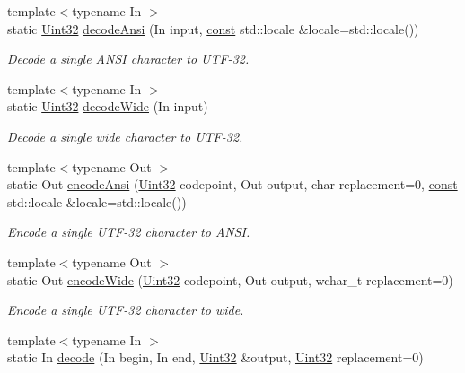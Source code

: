 \begin{DoxyCompactItemize}
{\footnotesize template$<$typename In $>$ }\\static \hyperlink{namespacesf_aa746fb1ddef4410bddf198ebb27e727c}{Uint32} \hyperlink{classsf_1_1_utf_3_0132_01_4_a68346ea833f88267a7c739d4d96fb86f}{decode\-Ansi} (In input, \hyperlink{term__entry_8h_a57bd63ce7f9a353488880e3de6692d5a}{const} std\-::locale \&locale=std\-::locale())
\begin{DoxyCompactList}\small\item\em Decode a single A\-N\-S\-I character to U\-T\-F-\/32. \end{DoxyCompactList}\item 
{\footnotesize template$<$typename In $>$ }\\static \hyperlink{namespacesf_aa746fb1ddef4410bddf198ebb27e727c}{Uint32} \hyperlink{classsf_1_1_utf_3_0132_01_4_a043fe25f5f4dbc205e78e6f1d99840dc}{decode\-Wide} (In input)
\begin{DoxyCompactList}\small\item\em Decode a single wide character to U\-T\-F-\/32. \end{DoxyCompactList}\item 
{\footnotesize template$<$typename Out $>$ }\\static Out \hyperlink{classsf_1_1_utf_3_0132_01_4_af6590226a071076ca22d818573a16ded}{encode\-Ansi} (\hyperlink{namespacesf_aa746fb1ddef4410bddf198ebb27e727c}{Uint32} codepoint, Out output, char replacement=0, \hyperlink{term__entry_8h_a57bd63ce7f9a353488880e3de6692d5a}{const} std\-::locale \&locale=std\-::locale())
\begin{DoxyCompactList}\small\item\em Encode a single U\-T\-F-\/32 character to A\-N\-S\-I. \end{DoxyCompactList}\item 
{\footnotesize template$<$typename Out $>$ }\\static Out \hyperlink{classsf_1_1_utf_3_0132_01_4_a52e511e74ddc5df1bbf18f910193bc47}{encode\-Wide} (\hyperlink{namespacesf_aa746fb1ddef4410bddf198ebb27e727c}{Uint32} codepoint, Out output, wchar\-\_\-t replacement=0)
\begin{DoxyCompactList}\small\item\em Encode a single U\-T\-F-\/32 character to wide. \end{DoxyCompactList}\item 
{\footnotesize template$<$typename In $>$ }\\static In \hyperlink{classsf_1_1_utf_3_0132_01_4_ad754ce8476f7b80563890dec12cefd46}{decode} (In begin, In end, \hyperlink{namespacesf_aa746fb1ddef4410bddf198ebb27e727c}{Uint32} \&output, \hyperlink{namespacesf_aa746fb1ddef4410bddf198ebb27e727c}{Uint32} replacement=0)

\end{DoxyCompactItemize}
